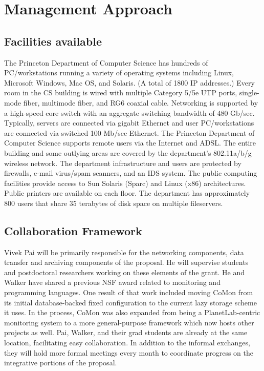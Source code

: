 \documentclass[12pt]{article}
\begin{document}
\section{Management Approach}

\subsection{Facilities available}

The Princeton Department of Computer Science has hundreds of
PC/workstations running a variety of operating systems including
Linux, Microsoft Windows, Mac OS, and Solaris. (A total of 1800 IP
addresses.) Every room in the CS building is wired with multiple
Category 5/5e UTP ports, single-mode fiber, multimode fiber, and RG6
coaxial cable. Networking is supported by a high-speed core switch
with an aggregate switching bandwidth of 480 Gb/sec. Typically,
servers are connected via gigabit Ethernet and user PC/workstations
are connected via switched 100 Mb/sec Ethernet. The Princeton
Department of Computer Science supports remote users via the Internet
and ADSL. The entire building and some outlying areas are covered by
the department's 802.11a/b/g wireless network. The department
infrastructure and users are protected by firewalls, e-mail virus/spam
scanners, and an IDS system. The public computing facilities provide
access to Sun Solaris (Sparc) and Linux (x86) architectures. Public
printers are available on each floor. The department has approximately
800 users that share 35 terabytes of disk space on multiple
fileservers.

\subsection{Collaboration Framework}

Vivek Pai will be primarily responsible for the networking components,
data transfer and archiving components of the proposal.  He will
supervise students and postdoctoral researchers working on these
elements of the grant.  He and Walker have shared a previous NSF award
related to monitoring and programming languages. One result of that
work included moving CoMon from its initial database-backed fixed
configuration to the current lazy storage scheme it uses. In the
process, CoMon was also expanded from being a PlanetLab-centric
monitoring system to a more general-purpose framework which now hosts
other projects as well. Pai, Walker, and their grad students are
already at the same location, facilitating easy collaboration. In
addition to the informal exchanges, they will hold more formal
meetings every month to coordinate progress on the integrative
portions of the proposal.
\end{document}
